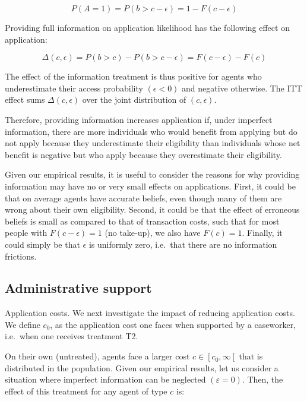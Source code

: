\documentclass[
]{article}
\begin{document}
\begin{equation}
P(A=1) =P(b>c-\epsilon)=1-F(c-\epsilon)
\end{equation}

Providing full information on application likelihood has the following effect on application:

\begin{equation}
\Delta(c,\epsilon)=P(b>c)-P(b>c-\epsilon)=F(c-\epsilon)-F(c)
\end{equation}

The effect of the information treatment is thus positive for agents who underestimate their access probability \((\epsilon < 0)\) and negative otherwise. The ITT effect sums \(\Delta(c,\epsilon)\) over the joint distribution of \((c,\epsilon)\).

Therefore, providing information increases application if, under imperfect information, there are more individuals who would benefit from applying but do not apply because they underestimate their eligibility than individuals whose net benefit is negative but who apply because they overestimate their eligibility.

Given our empirical results, it is useful to consider the reasons for why providing information may have no or very small effects on applications. First, it could be that on average agents have accurate beliefs, even though many of them are wrong about their own eligibility. Second, it could be that the effect of erroneous beliefs is small as compared to that of transaction costs, such that for most people with \(F (c − \epsilon) = 1\) (no take-up), we also have \(F (c) = 1\). Finally, it could simply be that \(\epsilon\) is uniformly zero, i.e.~that there are no information frictions.

\subsection{Administrative support}\label{administrative-support}

Application costs. We next investigate the impact of reducing application costs. We define \(c_0\), as the application cost one faces when supported by a caseworker, i.e.~when one receives treatment T2.

On their own (untreated), agents face a larger cost \(c \in\left[c_0, \infty\left[\right.\right.\) that is distributed in the population. Given our empirical results, let us consider a situation where imperfect information can be neglected \((\varepsilon=0)\). Then, the effect of this treatment for any agent of type \(c\) is:
\end{document}
